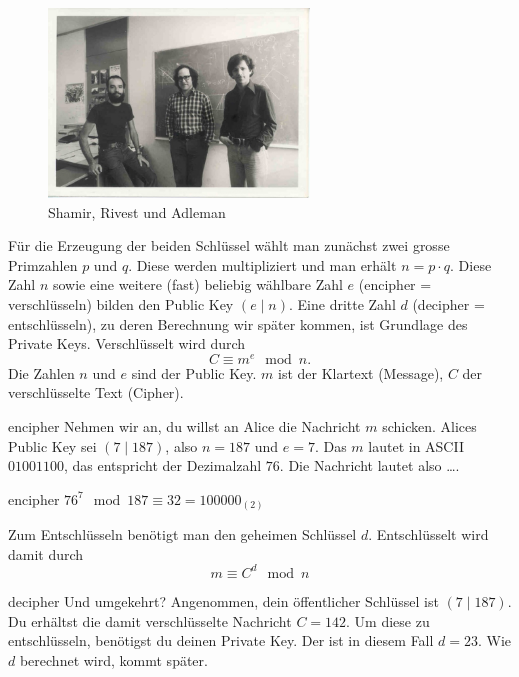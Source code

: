 \documentclass[%
<<<<<<< Updated upstream
11pt,%
twoside,%
titlepage,%
german,%
headsepline%
]{scrartcl}
\begin{document}
\begin{figure}
\begin{center}
\includegraphics[width=0.618\textwidth]{pictures/rsaleute}
\end{center}
\caption{Shamir, Rivest und Adleman}
\end{figure}

Für die Erzeugung der beiden Schlüssel wählt man zunächst zwei grosse Primzahlen $p$ und $q$. Diese werden multipliziert und man erhält $n=p\cdot q$. Diese Zahl $n$ sowie eine weitere (fast) beliebig wählbare Zahl  $e$ (encipher = verschlüsseln) bilden den Public Key $(e\mid n)$. Eine dritte Zahl $d$ (decipher = entschlüsseln), zu deren Berechnung wir später kommen, ist Grundlage des Private Keys. Verschlüsselt wird durch
$$C\equiv m^e\mod n.$$
Die Zahlen $n$ und $e$ sind der Public Key. $m$ ist der Klartext (Message), $C$ der verschlüsselte Text (Cipher).

\begin{uebenv}{encipher}
Nehmen wir an, du willst an Alice die Nachricht $m$ schicken. Alices Public Key sei $(7\mid 187)$, also $n=187$ und $e=7$.
Das $m$ lautet in ASCII $01001100$, das entspricht der Dezimalzahl $76$. Die Nachricht lautet also \dots.
\end{uebenv}

\begin{lsg}{encipher}
    $76^7\mod187\equiv32=100000_{(2)}$
\end{lsg}

Zum Entschlüsseln benötigt man den geheimen Schlüssel $d$. Entschlüsselt wird damit durch $$m\equiv C^d\mod n$$

\begin{uebenv}{decipher}
Und umgekehrt? Angenommen, dein öffentlicher Schlüssel ist $(7\mid 187)$. Du erhältst die damit verschlüsselte Nachricht $C=142$. Um diese zu entschlüsseln, benötigst du deinen Private Key. Der ist in diesem Fall $d=23$. Wie $d$ berechnet wird, kommt später.
\end{uebenv}
\end{document}
